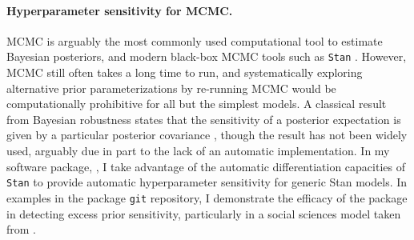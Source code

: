 \paragraph{Hyperparameter sensitivity for MCMC.}

MCMC is arguably the most commonly used computational tool to estimate Bayesian
posteriors, and modern black-box MCMC tools such as \texttt{Stan} \citep{rstan,
carpenter:2017:stan}.  However, MCMC still often takes a long time to run, and
systematically exploring alternative prior parameterizations by re-running MCMC
would be computationally prohibitive for all but the simplest models. A
classical result from Bayesian robustness states that the sensitivity of a
posterior expectation is given by a particular posterior covariance
\citep{gustafson:1996:localposterior, basu:1996:local}, though the result has
not been widely used, arguably due in part to the lack of an automatic
implementation. In my software package, \citet{giordano:2020:rstansensitivity},
I take advantage of the automatic differentiation capacities of
\texttt{Stan} to provide automatic hyperparameter sensitivity for
generic Stan models.  In examples in the package \texttt{git} repository,
I demonstrate the efficacy of the package in detecting excess prior
sensitivity, particularly in a social sciences model taken from
\citet[Chapter 13.5]{gelman:2006:arm}.
%
%
%
%
%
%
%
%
%
%
